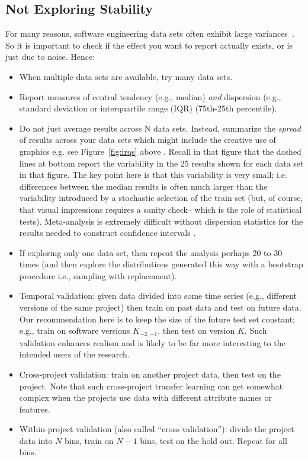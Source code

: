 \documentclass[10pt]{elsarticle}
\newcommand{\RED}{\color{black}}
\newcommand{\BLACK}{\color{black}}
\begin{document}
\subsection{Not Exploring Stability}

For many reasons, software engineering data sets often exhibit large variances~\cite{menzies12}. So it is important to check if the effect you want to report actually exists, or is just due to noise. Hence:

\begin{itemize}
\item When multiple data sets are available, try many data sets.
\item Report measures of central tendency (e.g., median) \textit{and} dispersion (e.g., standard deviation or interquartile range (IQR) (75th-25th percentile).
\item Do not just average results across N data sets. Instead, summarize the \textit{spread} of results across your data sets which might include the creative use of graphics e.g. 
\RED see Figure~\ref{fig:irqs} above \BLACK. Recall
in that figure that the dashed lines at bottom
report the variability in the 25 results shown for each
data set in that figure. The key point here is that this
variability is very small; i.e.  differences between the median results is often much larger than the variability introduced by a stochastic selection of the train set (but, of course, that visual impressions requires a sanity check-- which is the role of statistical tests). Meta-analysis is extremely difficult without dispersion statistics for the results needed to construct confidence intervals \cite{Bore09,Schm14}.
\item If exploring only one data set, then repeat the analysis perhaps 20 to 30 times (and then explore the distributions generated this way with a bootstrap procedure i.e., sampling with replacement). %
\item Temporal validation: given data divided into some time series (e.g., different versions of the same project) then train on past data and test on future data. Our recommendation here is to keep the size of the future test set constant; e.g., train on software versions $K_{-2,-1}$, then test on version $K$.  Such validation enhances realism and is likely to be far more interesting to the intended users of the research.
\item Cross-project validation: train on another project data, then test on the project. Note that such cross-project transfer learning can get somewhat complex when the projects use data with different attribute names or features.
\item Within-project validation (also called ``cross-validation''): divide the project data into $N$ bins, train on $N-1$ bins, test on the hold out. Repeat for all bins.  
\end{itemize}
\end{document}
